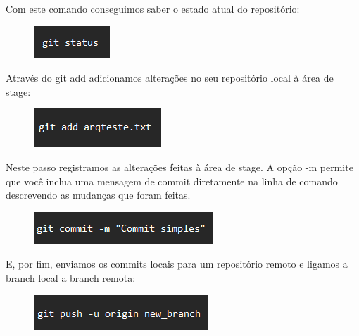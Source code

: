 \documentclass{article}
\begin{document}
    \vspace{0.5cm}

    Com este comando conseguimos saber o estado atual do repositório:

    \vspace{0.5cm}

    \begin{figure}[hb]
        \centering
        \includegraphics[width=0.25\linewidth]{status.png}
        \label{fig:enter-label}
    \end{figure}

    \vspace{0.5cm}

    Através do git add adicionamos alterações no seu repositório local à área de stage:

    \vspace{0.5cm}
    
    \begin{figure}[!hb]
        \centering
        \includegraphics[width=0.4\linewidth]{add.png}
        \label{fig:enter-label}
    \end{figure}

    \vspace{9cm}

    Neste passo registramos as alterações feitas à área de stage. A opção -m permite que você inclua uma mensagem de commit diretamente na linha de comando descrevendo as mudanças que foram feitas. 

    \vspace{0.5cm}

    \begin{figure}[hb]
        \centering
        \includegraphics[width=0.55\linewidth]{commit.png}
        \label{fig:enter-label}
    \end{figure}

    \vspace{0.5cm}

    E, por fim, enviamos os commits locais para um repositório remoto e ligamos a branch local a branch remota:

    \vspace{0.5cm}

    \begin{figure}[hb]
        \centering
        \includegraphics[width=0.55\linewidth]{push.png}
        \label{fig:enter-label}
    \end{figure}

    
\end{document}
